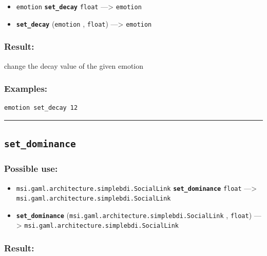 \documentclass[]{book}
\providecommand{\tightlist}{%
  \setlength{\itemsep}{0pt}\setlength{\parskip}{0pt}}
\theoremstyle{definition}
\theoremstyle{definition}
\theoremstyle{definition}
\theoremstyle{remark}
\begin{document}
\begin{itemize}
\tightlist
\item
  \texttt{emotion} \textbf{\texttt{set\_decay}} \texttt{float}
  ---\textgreater{} \texttt{emotion}
\item
  \textbf{\texttt{set\_decay}} (\texttt{emotion} , \texttt{float})
  ---\textgreater{} \texttt{emotion}
\end{itemize}

\subsubsection{Result:}\label{result-441}

change the decay value of the given emotion

\subsubsection{Examples:}\label{examples-314}

\begin{verbatim}
emotion set_decay 12 
\end{verbatim}

\begin{center}\rule{0.5\linewidth}{\linethickness}\end{center}

\subsection{\texorpdfstring{\texttt{set\_dominance}}{set\_dominance}}\label{set_dominance}

\subsubsection{Possible use:}\label{possible-use-458}

\begin{itemize}
\tightlist
\item
  \texttt{msi.gaml.architecture.simplebdi.SocialLink}
  \textbf{\texttt{set\_dominance}} \texttt{float} ---\textgreater{}
  \texttt{msi.gaml.architecture.simplebdi.SocialLink}
\item
  \textbf{\texttt{set\_dominance}}
  (\texttt{msi.gaml.architecture.simplebdi.SocialLink} , \texttt{float})
  ---\textgreater{} \texttt{msi.gaml.architecture.simplebdi.SocialLink}
\end{itemize}

\subsubsection{Result:}\label{result-442}
\end{document}
